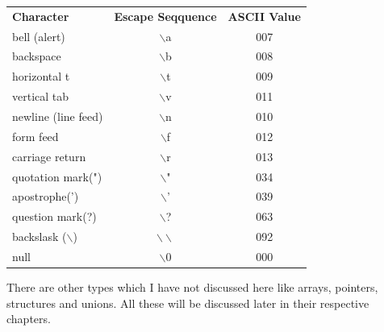 \begin{table}[!h]
\begin{center}
\caption{Escape Sequences}
\begin{longtable}{lcc}
\textbf{Character}&\textbf{Escape Seqquence}&\textbf{ASCII Value}\\
bell (alert)&$\backslash$a&007\\
backspace&$\backslash$b&008\\
horizontal t&$\backslash$t&009\\
vertical tab&$\backslash$v&011\\
newline (line feed)&$\backslash$n&010\\
form feed&$\backslash$f&012\\
carriage return&$\backslash$r&013\\
quotation mark(")&$\backslash$"&034\\
apostrophe(')&$\backslash$'&039\\
question mark(?)&$\backslash$?&063\\
backslask ($\backslash$)&$\backslash\backslash$&092\\
null&$\backslash$0&000
\end{longtable}
\end{center}
\end{table}

There are other types which I have not discussed here like arrays, pointers,
structures and unions. All these will be discussed later in their respective
chapters.